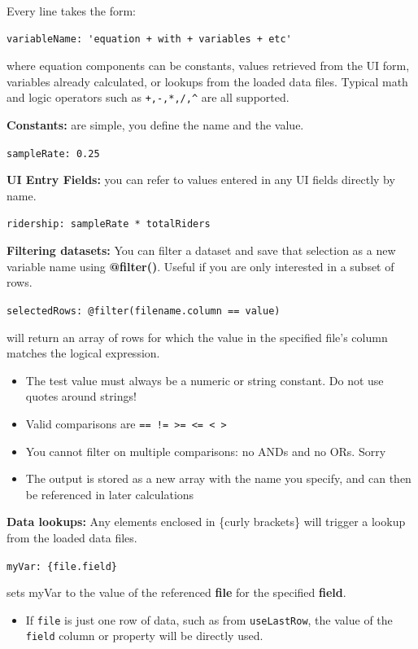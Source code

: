 Every line takes the form:

\begin{verbatim}
variableName: 'equation + with + variables + etc'
\end{verbatim}

where equation components can be constants, values retrieved from the UI
form, variables already calculated, or lookups from the loaded data
files. Typical math and logic operators such as \texttt{+,-,*,/,\^{}}
are all supported.

\textbf{Constants:} are simple, you define the name and the value.

\texttt{sampleRate:\ 0.25}

\textbf{UI Entry Fields:} you can refer to values entered in any UI
fields directly by name.

\texttt{ridership:\ \textquotesingle{}sampleRate\ *\ totalRiders\textquotesingle{}}

\textbf{Filtering datasets:} You can filter a dataset and save that
selection as a new variable name using \textbf{@filter()}. Useful if you
are only interested in a subset of rows.

\texttt{selectedRows:\ @filter(filename.column\ ==\ value)}

will return an array of rows for which the value in the specified file's
column matches the logical expression.

\begin{itemize}
\tightlist
\item
  The test value must always be a numeric or string constant. Do not use
  quotes around strings!
\item
  Valid comparisons are
  \texttt{==\ !=\ \textgreater{}=\ \textless{}=\ \textless{}\ \textgreater{}}
\item
  You cannot filter on multiple comparisons: no ANDs and no ORs. Sorry
\item
  The output is stored as a new array with the name you specify, and can
  then be referenced in later calculations
\end{itemize}

\textbf{Data lookups:} Any elements enclosed in \{curly brackets\} will
trigger a lookup from the loaded data files.

\texttt{myVar:\ \{file.field\}}

sets myVar to the value of the referenced \textbf{file} for the
specified \textbf{field}.

\begin{itemize}
\tightlist
\item
  If \texttt{file} is just one row of data, such as from
  \texttt{useLastRow}, the value of the \texttt{field} column or
  property will be directly used.
\end{itemize}

